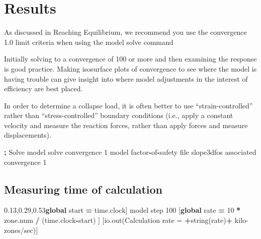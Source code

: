 \documentclass[a4paper, nobind]{templates/ociamthesis}
\newenvironment{Shaded}{\begin{snugshade}}{\end{snugshade}}
\newcommand{\BuiltInTok}[1]{#1}
\newcommand{\DecValTok}[1]{\textcolor[rgb]{0.00,0.00,0.81}{#1}}
\newcommand{\KeywordTok}[1]{\textcolor[rgb]{0.13,0.29,0.53}{\textbf{#1}}}
\newcommand{\NormalTok}[1]{#1}
\newcommand{\OperatorTok}[1]{\textcolor[rgb]{0.81,0.36,0.00}{\textbf{#1}}}
\newcommand{\StringTok}[1]{\textcolor[rgb]{0.31,0.60,0.02}{#1}}
\renewenvironment{Shaded}
{
  \vspace{10pt}%
  \begin{snugshade}%
}{%
  \end{snugshade}%
  \vspace{8pt}%
}
\begin{document}
\hypertarget{results-1}{%
\section{Results}\label{results-1}}

As discussed in Reaching Equilibrium, we recommend you use the
convergence 1.0 limit criteria when using the model solve command

Initially solving to a convergence of 100 or more and then examining the
response is good practice. Making isosurface plots of convergence to see
where the model is having trouble can give insight into where model
adjustments in the interest of efficiency are best placed.

In order to determine a collapse load, it is often better to use
``strain-controlled'' rather than ``stress-controlled'' boundary conditions
(i.e., apply a constant velocity and measure the reaction forces, rather
than apply forces and measure displacements).

\begin{Shaded}
\begin{Highlighting}[]
\OperatorTok{;}\NormalTok{ Solve}
\NormalTok{model solve convergence }\DecValTok{1}
\NormalTok{model factor}\OperatorTok{{-}}\NormalTok{of}\OperatorTok{{-}}\NormalTok{safety }\BuiltInTok{file} \StringTok{\textquotesingle{}slope3dfos\textquotesingle{}}\NormalTok{ associated convergence }\DecValTok{1}
\end{Highlighting}
\end{Shaded}

\hypertarget{measuring-time-of-calculation}{%
\subsection{Measuring time of calculation}\label{measuring-time-of-calculation}}

\begin{Shaded}
\begin{Highlighting}[]
\NormalTok{[}\KeywordTok{global}\NormalTok{ start }\OperatorTok{=}\NormalTok{ time.clock]}
\NormalTok{model step }\DecValTok{100}
\NormalTok{[}\KeywordTok{global}\NormalTok{ rate }\OperatorTok{=} \DecValTok{10} \OperatorTok{*}\NormalTok{ zone.num }\OperatorTok{/}\NormalTok{ (time.clock}\OperatorTok{{-}}\NormalTok{start) ]}
\NormalTok{[io.out(}\StringTok{\textquotesingle{}Calculation rate = \textquotesingle{}}\OperatorTok{+}\NormalTok{string(rate)}\OperatorTok{+}\StringTok{\textquotesingle{} kilo{-}zones/sec\textquotesingle{}}\NormalTok{)]}
\end{Highlighting}
\end{Shaded}
\end{document}
